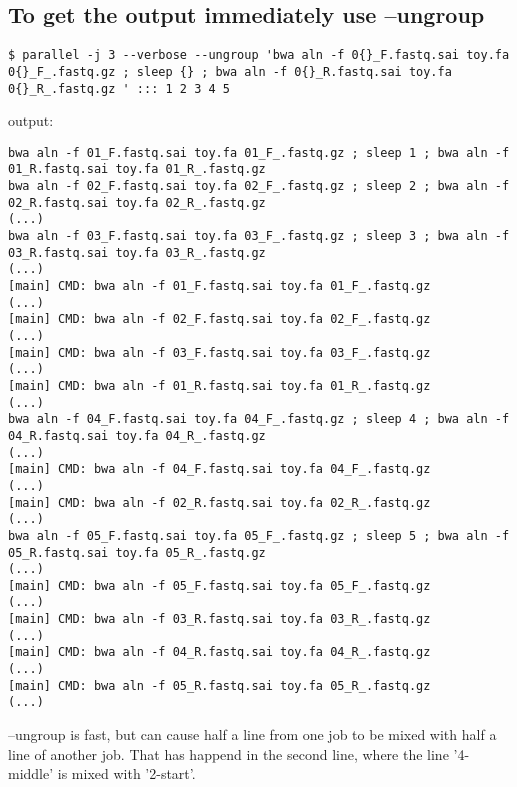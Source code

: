 \documentclass{article}
\begin{document}
\subsection{To get the output immediately use --ungroup}
\begin{lstlisting}
$ parallel -j 3 --verbose --ungroup 'bwa aln -f 0{}_F.fastq.sai toy.fa 0{}_F_.fastq.gz ; sleep {} ; bwa aln -f 0{}_R.fastq.sai toy.fa 0{}_R_.fastq.gz ' ::: 1 2 3 4 5
\end{lstlisting}
output:
\begin{lstlisting}
bwa aln -f 01_F.fastq.sai toy.fa 01_F_.fastq.gz ; sleep 1 ; bwa aln -f 01_R.fastq.sai toy.fa 01_R_.fastq.gz 
bwa aln -f 02_F.fastq.sai toy.fa 02_F_.fastq.gz ; sleep 2 ; bwa aln -f 02_R.fastq.sai toy.fa 02_R_.fastq.gz 
(...)
bwa aln -f 03_F.fastq.sai toy.fa 03_F_.fastq.gz ; sleep 3 ; bwa aln -f 03_R.fastq.sai toy.fa 03_R_.fastq.gz 
(...)
[main] CMD: bwa aln -f 01_F.fastq.sai toy.fa 01_F_.fastq.gz
(...)
[main] CMD: bwa aln -f 02_F.fastq.sai toy.fa 02_F_.fastq.gz
(...)
[main] CMD: bwa aln -f 03_F.fastq.sai toy.fa 03_F_.fastq.gz
(...)
[main] CMD: bwa aln -f 01_R.fastq.sai toy.fa 01_R_.fastq.gz
(...)
bwa aln -f 04_F.fastq.sai toy.fa 04_F_.fastq.gz ; sleep 4 ; bwa aln -f 04_R.fastq.sai toy.fa 04_R_.fastq.gz 
(...)
[main] CMD: bwa aln -f 04_F.fastq.sai toy.fa 04_F_.fastq.gz
(...)
[main] CMD: bwa aln -f 02_R.fastq.sai toy.fa 02_R_.fastq.gz
(...)
bwa aln -f 05_F.fastq.sai toy.fa 05_F_.fastq.gz ; sleep 5 ; bwa aln -f 05_R.fastq.sai toy.fa 05_R_.fastq.gz 
(...)
[main] CMD: bwa aln -f 05_F.fastq.sai toy.fa 05_F_.fastq.gz
(...)
[main] CMD: bwa aln -f 03_R.fastq.sai toy.fa 03_R_.fastq.gz
(...)
[main] CMD: bwa aln -f 04_R.fastq.sai toy.fa 04_R_.fastq.gz
(...)
[main] CMD: bwa aln -f 05_R.fastq.sai toy.fa 05_R_.fastq.gz
(...)
\end{lstlisting}

--ungroup is fast, but can cause half a line from one job to be mixed with half a line of another job. That has happend in the second line, where the line '4-middle' is mixed with '2-start'.
\end{document}
